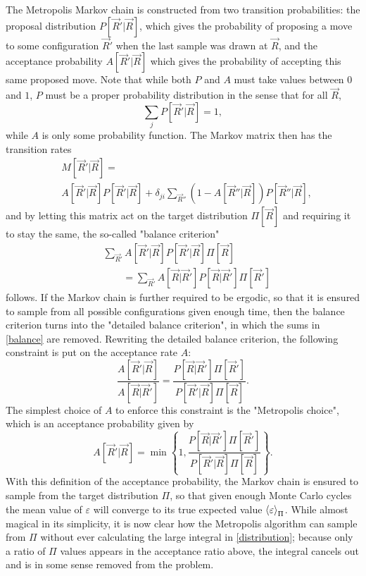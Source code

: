 \documentclass[a4paper,8pt]{article}
\begin{document}
\begin{multicols}{2}
The Metropolis Markov chain is constructed from two transition probabilities: the proposal distribution $P[\vec{R}'|\vec{R}]$, which gives the probability of proposing a move to some configuration $\vec{R}'$ when the last sample was drawn at $\vec{R}$, and the acceptance probability $A[\vec{R}'|\vec{R}]$ which gives the probability of accepting this same proposed move. Note that while both $P$ and $A$ must take values between $0$ and $1$, $P$ must be a proper probability distribution in the sense that for all $\vec{R}$,
\begin{equation}
\sum\limits_j P[\vec{R}'|\vec{R}] = 1,
\end{equation}
while $A$ is only some probability function. The Markov matrix then has the transition rates
\begin{align}
&M[\vec{R}'|\vec{R}] = \nonumber\\
&A[\vec{R}'|\vec{R}]P[\vec{R}'|\vec{R}] + \delta_{ji}\sum\limits_{\vec{R}''} (1-A[\vec{R}''|\vec{R}])P[\vec{R}''|\vec{R}],
\end{align}
and by letting this matrix act on the target distribution $\Pi[\vec{R}]$ and requiring it to stay the same, the so-called "balance criterion" 
\begin{align}
&\sum\limits_{\vec{R}'} A[\vec{R}'|\vec{R}]P[\vec{R}'|\vec{R}]\Pi[\vec{R}] \nonumber\\
&\qquad = \sum\limits_{\vec{R}'} A[\vec{R}|\vec{R}']P[\vec{R}|\vec{R}']\Pi[\vec{R}']  \label{balance}
\end{align}
follows. If the Markov chain is further required to be ergodic, so that it is ensured to sample from all possible configurations given enough time, then the balance criterion turns into the "detailed balance criterion", in which the sums in \eqref{balance} are removed. Rewriting the detailed balance criterion, the following constraint is put on the acceptance rate $A$:
\begin{equation}
\frac{A[\vec{R}'|\vec{R}]}{A[\vec{R}|\vec{R}']} = \frac{P[\vec{R}|\vec{R}']\Pi[\vec{R}']}{P[\vec{R}'|\vec{R}]\Pi[\vec{R}]}.
\end{equation}
The simplest choice of $A$ to enforce this constraint is the "Metropolis choice", which is an acceptance probability given by
\begin{equation}
A[\vec{R}'|\vec{R}] = \min\left\{1,\frac{P[\vec{R}|\vec{R}']\Pi[\vec{R}']}{P[\vec{R}'|\vec{R}]\Pi[\vec{R}]}\right\}. \label{acc}
\end{equation}
With this definition of the acceptance probability, the Markov chain is ensured to sample from the target distribution $\Pi$, so that given enough Monte Carlo cycles the mean value of $\varepsilon$ will converge to its true expected value $\ev{\varepsilon}_\Pi$. While almost magical in its simplicity, it is now clear how the Metropolis algorithm can sample from $\Pi$ without ever calculating the large integral in \eqref{distribution}; because only a ratio of $\Pi$ values appears in the acceptance ratio above, the integral cancels out and is in some sense removed from the problem.


\end{multicols}
\end{document}
